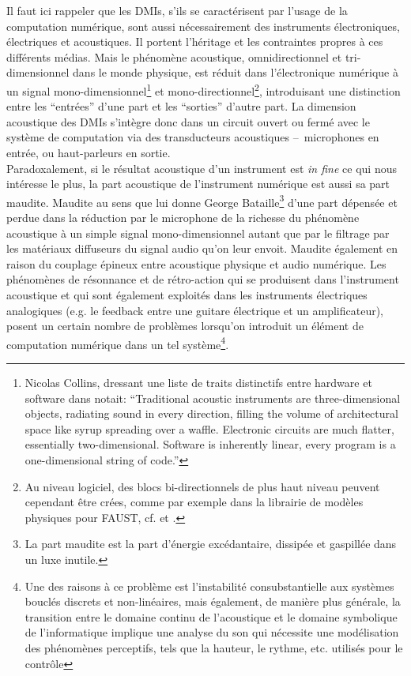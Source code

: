 \noindent Il faut ici rappeler que les \glspl{DMI}, s'ils se caractérisent par l'usage de la computation numérique, sont aussi nécessairement des instruments électroniques, électriques et acoustiques. Il portent l'héritage et les contraintes propres à ces différents médias. Mais le phénomène acoustique, omnidirectionnel et tri-dimensionnel dans le monde physique, est réduit dans l'électronique numérique à un signal mono-dimensionnel\footnote{Nicolas Collins, dressant une liste de traits distinctifs entre hardware et software dans \cite{collins_semiconducting_2013} notait: ``Traditional acoustic instruments are three-dimensional objects, radiating sound in every direction, filling the volume of architectural space like syrup spreading over a waffle. Electronic circuits are much flatter, essentially two-dimensional. Software is inherently linear, every program is a one-dimensional string of code.''} et mono-directionnel\footnote{Au niveau logiciel, des blocs bi-directionnels de plus haut niveau peuvent cependant être crées, comme par exemple dans la librairie de modèles physiques pour \gls{FAUST}, cf. \cite{berdahl_introduction_2012} et \cite{michon_faust_2018}.}, introduisant une distinction entre les ``entrées'' d'une part et les ``sorties'' d'autre part. La dimension acoustique des \glspl{DMI} s'intègre donc dans un circuit ouvert ou fermé avec le système de computation via des transducteurs acoustiques --~microphones en entrée, ou haut-parleurs en sortie.\\
\indent Paradoxalement, si le résultat acoustique d'un instrument est \textit{in fine} ce qui nous intéresse le plus, la part acoustique de l'instrument numérique est aussi sa part maudite. Maudite au sens que lui donne George Bataille\footnote{La part maudite est la part d'énergie excédantaire, dissipée et gaspillée dans un luxe inutile.} d'une part dépensée et perdue dans la réduction par le microphone de la richesse du phénomène acoustique à un simple signal mono-dimensionnel autant que par le filtrage par les matériaux diffuseurs du signal audio qu'on leur envoit. Maudite également en raison du couplage épineux entre acoustique physique et audio numérique. Les phénomènes de résonnance et de rétro-action qui se produisent dans l'instrument acoustique et qui sont également exploités dans les instruments électriques analogiques (e.g. le feedback entre une guitare électrique et un amplificateur), posent un certain nombre de problèmes lorsqu'on introduit un élément de computation numérique dans un tel système\footnote{Une des raisons à ce problème est l'instabilité consubstantielle aux systèmes bouclés discrets et non-linéaires, mais également, de manière plus générale, la transition entre le domaine continu de l'acoustique et le domaine symbolique de l'informatique implique une analyse du son qui nécessite une modélisation des phénomènes perceptifs, tels que la hauteur, le rythme, etc. utilisés pour le contrôle}.\\ 
